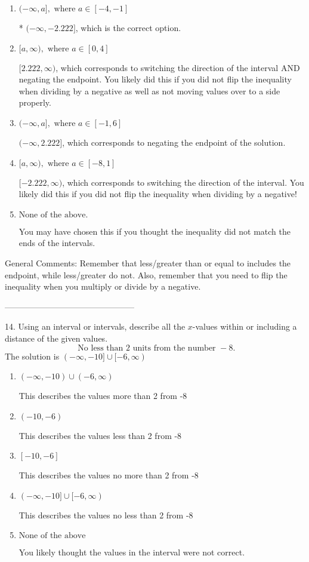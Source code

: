 \documentclass{extbook}[14pt]
\begin{document}
\begin{enumerate}[label=\Alph*.] 
\item $ (-\infty, a], \text{ where } a \in [-4, -1] $ 

 * $(-\infty, -2.222]$, which is the correct option. 
\item $ [a, \infty), \text{ where } a \in [0, 4] $ 

  $[2.222, \infty)$, which corresponds to switching the direction of the interval AND negating the endpoint. You likely did this if you did not flip the inequality when dividing by a negative as well as not moving values over to a side properly. 
\item $ (-\infty, a], \text{ where } a \in [-1, 6] $ 

  $(-\infty, 2.222]$, which corresponds to negating the endpoint of the solution. 
\item $ [a, \infty), \text{ where } a \in [-8, 1] $ 

  $[-2.222, \infty)$, which corresponds to switching the direction of the interval. You likely did this if you did not flip the inequality when dividing by a negative! 
\item $ \text{None of the above}. $ 

 You may have chosen this if you thought the inequality did not match the ends of the intervals. 
\end{enumerate} 
 
General Comments: Remember that less/greater than or equal to includes the endpoint, while less/greater do not. Also, remember that you need to flip the inequality when you multiply or divide by a negative.

-----------------------------------------------

14. Using an interval or intervals, describe all the $x$-values within or including a distance of the given values.
\[ \text{ No less than } 2 \text{ units from the number } -8. \] 
The solution is $ (-\infty, -10] \cup [-6, \infty) $ 

\begin{enumerate}[label=\Alph*.] 
\item $ (-\infty, -10) \cup (-6, \infty) $ 

 This describes the values more than 2 from -8 
\item $ (-10, -6) $ 

 This describes the values less than 2 from -8 
\item $ [-10, -6] $ 

 This describes the values no more than 2 from -8 
\item $ (-\infty, -10] \cup [-6, \infty) $ 

 This describes the values no less than 2 from -8 
\item $ \text{None of the above} $ 

 You likely thought the values in the interval were not correct. 
\end{enumerate} 
 
\end{document}

